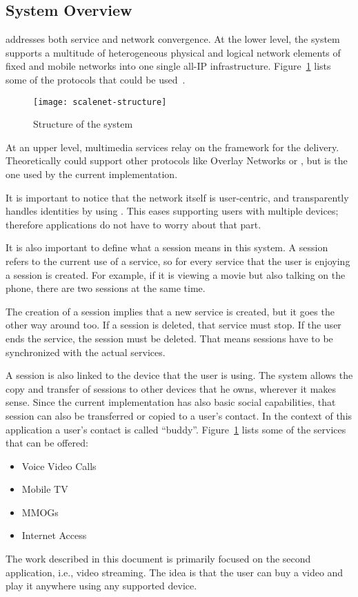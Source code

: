 \subsection{System Overview} %
\label{sub:overviewscalenet}

 addresses both service and network convergence.
At the lower level, the system supports a multitude of heterogeneous physical and logical network elements of fixed and mobile networks into one single all-IP infrastructure.
Figure~\ref{fig:scalenet-structure} lists some of the protocols that could be used~\cite{SIV08B}.

\begin{figure}[htbp]
  \centering
    \texttt{[image: scalenet-structure]}
  \caption{Structure of the system}
  \label{fig:scalenet-structure}
\end{figure}

At an upper level, multimedia services relay on the  framework for the delivery.
Theoretically  could support other protocols like Overlay Networks or , but  is the one used by the current implementation.

It is important to notice that the network itself is user-centric, and transparently handles identities by using .
This eases supporting users with multiple devices; therefore applications do not have to worry about that part.

It is also important to define what a session means in this system.
A session refers to the current use of a service, so for every service that the user is enjoying a session is created.
For example, if it is viewing a movie but also talking on the  phone, there are two sessions at the same time.

The creation of a session implies that a new service is created, but it goes the other way around too.
If a session is deleted, that service must stop.
If the user ends the service, the session must be deleted.
That means sessions have to be synchronized with the actual services.

A session is also linked to the device that the user is using.
The system allows the copy and transfer of sessions to other devices that he owns, wherever it makes sense.
Since the current implementation has also basic social capabilities, that session can also be transferred or copied to a user's contact.
In the context of this application a user's contact is called ``buddy''.
Figure~\ref{fig:scalenet-structure} lists some of the services that can be offered:

\begin{itemize}
  \item Voice \et{} Video Calls
  \item Mobile TV \et{} 
  \item {}\acp{MMOG}
  \item Internet Access
\end{itemize}

The work described in this document is primarily focused on the second application, i.e., video streaming.
The idea is that the user can buy a video and play it anywhere using any supported device.

